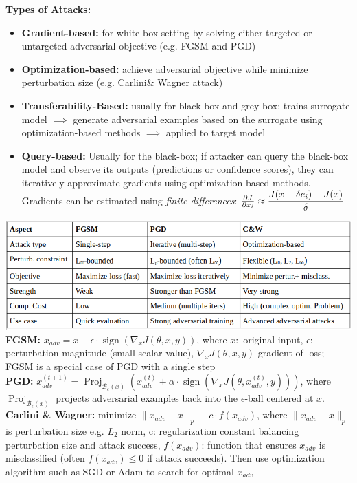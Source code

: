 \textbf{Types of Attacks:}
\begin{itemize}
    \item \textbf{Gradient-based:} for white-box setting by solving either targeted or untargeted adversarial objective (e.g. FGSM and PGD)
    \item \textbf{Optimization-based:} achieve adversarial objective while minimize perturbation size (e.g. Carlini\& Wagner attack)
    \item \textbf{Transferability-Based:} usually for black-box and grey-box; trains surrogate model $\implies$ generate adversarial examples based on the surrogate using optimization-based methods $\implies$ applied to target model
    \item \textbf{Query-based:} Usually for the black-box; if attacker can query the black-box model and observe its outputs (predictions or confidence scores), they can iteratively approximate gradients using optimization-based methods. Gradients can be estimated using \emph{finite differences}: $\frac{\partial J}{\partial x_i}\approx \dfrac{J(x+\delta e_i)-J(x)}{\delta}$
\end{itemize}
\includegraphics[scale =0.17]{contents/imgs/attacks_new.png}
\textbf{FGSM:} $x_{adv}=x+\epsilon \cdot \operatorname{sign}(\nabla_x J(\theta, x, y))$, where \(x:\) original input, \(\epsilon:\) perturbation magnitude (small scalar value), \(\nabla_x J(\theta, x, y)\) gradient of loss; FGSM is a special case of PGD with a single step\\
\textbf{PGD:} $x_{adv}^{(t+1)} = \operatorname{Proj}_{\mathcal{B}_\epsilon(x)}(x_{adv}^{(t)} + \alpha \cdot \operatorname{sign}(\nabla_x J(\theta, x_{adv}^{(t)}, y)))$, where \(\operatorname{Proj}_{\mathcal{B}_\epsilon(x)}\) projects adversarial examples back into the \(\epsilon\)-ball centered at \(x\).\\
\textbf{Carlini \& Wagner:} minimize \(\|x_{adv}-x\|_p + c\cdot f(x_{adv})\), where \(\|x_{adv}-x\|_p\) is perturbation size e.g. $L_2$ norm, c: regularization constant balancing perturbation size and attack success, \(f(x_{adv})\): function that ensures \(x_{adv}\) is misclassified (often \(f(x_{adv})\leq 0\) if attack succeeds). Then use optimization algorithm such as SGD or Adam to search for optimal \(x_{adv}\)

